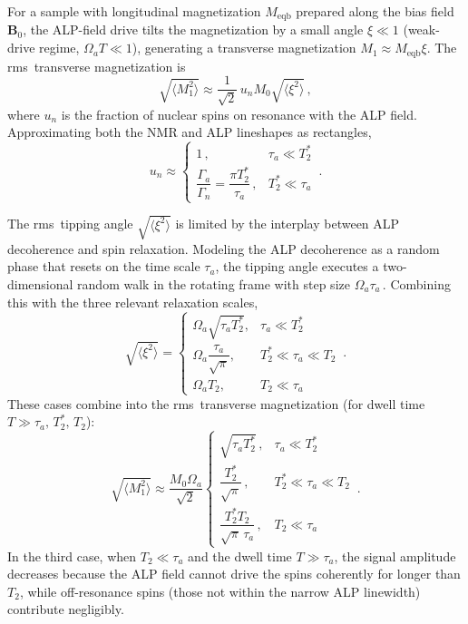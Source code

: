 For a sample with longitudinal magnetization $M_\mathrm{eqb}$ prepared along the bias field $\boldsymbol{B}_0$, the ALP-field drive tilts the magnetization by a small angle $\xi \ll 1$ (weak-drive regime, $\Omega_a T \ll 1$), generating a transverse magnetization $M_1 \approx M_\mathrm{eqb}\xi$.
The rms\ transverse magnetization is\,\cite{Yuzhe2023_FrequencyScanning}
\begin{equation}
    \sqrt{\langle M_{1}^2 \rangle} \approx \dfrac{1}{\sqrt{2}}\, u_n M_{0} \sqrt{\langle \xi^2 \rangle}
    \,,\label{eq:M1_rms}
\end{equation}
where $u_n$ is the fraction of nuclear spins on resonance with the ALP field.
Approximating both the NMR and ALP lineshapes as rectangles,
\begin{equation}
    u_n \approx \left\{
    \begin{array}{cl}
    1\,,
    &  \tau_a \ll T_2^* \\[6pt]
    \dfrac{\Gamma_a}{\Gamma_{n}} = \dfrac{\pi T_2^*}{\tau_a}\,,
    &  T_2^* \ll \tau_a
    \end{array} \right.
    \,.\label{eq:un}
\end{equation}

The rms\ tipping angle $\sqrt{\langle\xi^2\rangle}$ is limited by the interplay between ALP decoherence and spin relaxation.
Modeling the ALP decoherence as a random phase that resets on the time scale $\tau_a$, the tipping angle executes a two-dimensional random walk in the rotating frame with step size $\Omega_a\tau_a$\,\cite{Yuzhe2023_FrequencyScanning}.
Combining this with the three relevant relaxation scales,
\begin{equation}
    \sqrt{\langle \xi^2\rangle}  = \left\{
    \begin{array}{cl}
    \Omega_{a}\sqrt{\tau_a T_2^*} ,
    &  \tau_a \ll T_2^*\\[6pt]
    \Omega_a\dfrac{\tau_a}{\sqrt{\pi}} ,
    &  T_2^*\ll\tau_a \ll T_2\\[6pt]
    \Omega_a T_2 ,
    &  T_2 \ll \tau_a
    \end{array} \right.
    \,.\label{eq:rms_xi}
\end{equation}
These cases combine into the rms\ transverse magnetization (for dwell time $T \gg \tau_a,\,T_2^*,\,T_2$):
\begin{equation}
    \sqrt{\langle M_{1}^2 \rangle} \approx \dfrac{M_{0}\Omega_a}{\sqrt{2}}\left\{
    \begin{array}{cl}
    \sqrt{\tau_a T_2^*}\, ,
    &  \tau_a \ll T_2^*\\[6pt]
    \dfrac{T_2^*}{\sqrt{\pi}}\, ,
    &  T_2^*\ll\tau_a \ll T_2\\[6pt]
    \dfrac{T_2^* T_2}{\sqrt{\pi}\,\tau_a}\, ,
    &  T_2 \ll \tau_a
    \end{array} \right.
    \,.\label{eq:M1_regimes}
\end{equation}
In the third case, when $T_2 \ll \tau_a$ and the dwell time $T \gg \tau_a$, the signal amplitude decreases because the ALP field cannot drive the spins coherently for longer than $T_2$, while off-resonance spins (those not within the narrow ALP linewidth) contribute negligibly.


